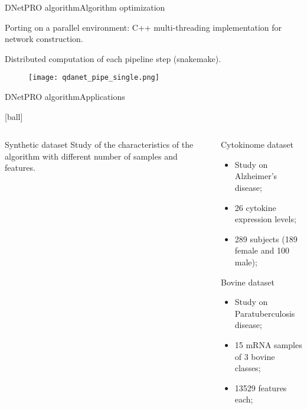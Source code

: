 \documentclass{standalone}
\begin{document}
\begin{frame}{DNetPRO algorithm}{Algorithm optimization}

  Porting on a parallel environment: \textsf{C++} multi-threading implementation for network construction.

  Distributed computation of each pipeline step (\textsf{snakemake}).

  \begin{figure}
    \centering
    \texttt{[image: qdanet\_pipe\_single.png]}
  \end{figure}

\end{frame}


\begin{frame}{DNetPRO algorithm}{Applications}

  [ball]

  \begin{columns}

    \begin{column}{0.5\textwidth}

      \begin{exampleblock}{Synthetic dataset}
          Study of the characteristics of the algorithm with different number of samples and features.

          \begin{figure}
            \centering
            \def\svgwidth{0.8\linewidth}
            
          \end{figure}

      \end{exampleblock}

    \end{column}
    \begin{column}{0.5\textwidth}

      \begin{block}{Cytokinome dataset}
        \begin{itemize}
          \item Study on Alzheimer's disease;
          \item 26 cytokine expression levels;
          \item 289 subjects (189 female and 100 male);
        \end{itemize}
      \end{block}

      \begin{alertblock}{Bovine dataset}
        \begin{itemize}
          \item Study on Paratuberculosis disease;
          \item 15 mRNA samples of 3 bovine classes;
          \item 13529 features each;
        \end{itemize}
      \end{alertblock}


\end{column}
\end{columns}
\end{frame}
\end{document}
